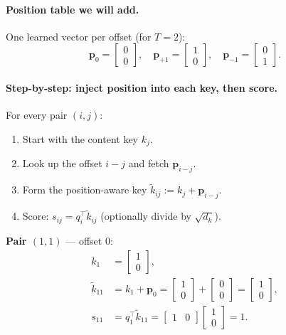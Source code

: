 \documentclass[11pt]{article}
\begin{document}
\paragraph{Position table we will add.}
One learned vector per offset (for \(T=2\)):
\[
  \mathbf{p}_{0}=\begin{bmatrix}0\\0\end{bmatrix},\quad
  \mathbf{p}_{+1}=\begin{bmatrix}1\\0\end{bmatrix},\quad
  \mathbf{p}_{-1}=\begin{bmatrix}0\\1\end{bmatrix}.
\]

\paragraph{Step-by-step: inject position into each key, then score.}
For every pair \((i,j)\):
\begin{enumerate}[leftmargin=*]
  \item Start with the content key \(k_j\).
  \item Look up the offset \(i-j\) and fetch \(\mathbf{p}_{i-j}\).
  \item Form the position-aware key
        \(\tilde{k}_{ij} := k_j + \mathbf{p}_{i-j}\).
  \item Score: \(s_{ij} = q_i^\top \tilde{k}_{ij}\)
        (optionally divide by \(\sqrt{d_k}\)).
\end{enumerate}

\textbf{Pair \((1,1)\)} --- offset \(0\):
\begin{align*}
  k_1 &= \begin{bmatrix}1\\0\end{bmatrix}, \\
  \tilde{k}_{11}
    &= k_1 + \mathbf{p}_{0}
     = \begin{bmatrix}1\\0\end{bmatrix}+\begin{bmatrix}0\\0\end{bmatrix}
     = \begin{bmatrix}1\\0\end{bmatrix}, \\
  s_{11}
    &= q_1^\top \tilde{k}_{11}
     = \begin{bmatrix}1&0\end{bmatrix}\begin{bmatrix}1\\0\end{bmatrix}
     = 1.
\end{align*}
\end{document}
